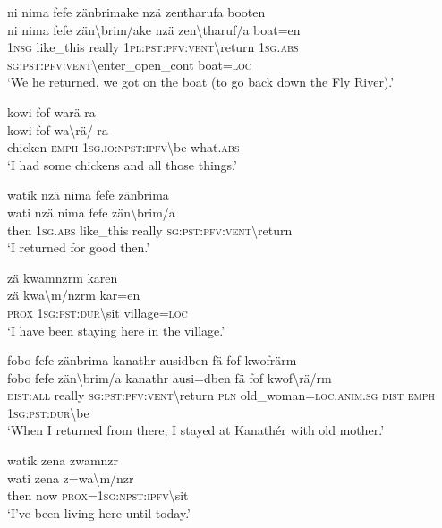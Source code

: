 \ea\label{ex:14:a3207}
ni nima fefe zänbrimake nzä zentharufa booten\\
\gll ni	nima	fefe	zän{\textbackslash}brim/ake	nzä	zen{\textbackslash}tharuf/a	boat=en\\
     1\textsc{nsg}	like\_this	really	1\textsc{pl}:\textsc{pst}:\textsc{pfv}:\textsc{vent}{\textbackslash}return	1\textsc{sg}.\textsc{abs}	\textsc{sg}:\textsc{pst}:\textsc{pfv}:\textsc{vent}{\textbackslash}enter\_open\_cont	boat=\textsc{loc}\\
\glt `We he returned, we got on the boat (to go back down the Fly River).'
\z

\ea\label{ex:14:a3208}
kowi fof warä ra\\
\gll kowi	fof	wa{\textbackslash}rä/	ra\\
     chicken	\textsc{emph}	1\textsc{sg}.\textsc{io}:\textsc{npst}:\textsc{ipfv}{\textbackslash}be	what.\textsc{abs}\\
\glt `I had some chickens and all those things.'
\z

\ea\label{ex:14:a3210}
watik nzä nima fefe zänbrima\\
\gll wati	nzä	nima	fefe	zän{\textbackslash}brim/a\\
     then	1\textsc{sg}.\textsc{abs}	like\_this	really	\textsc{sg}:\textsc{pst}:\textsc{pfv}:\textsc{vent}{\textbackslash}return\\
\glt `I returned for good then.'
\z

\ea\label{ex:14:a3211}
zä kwamnzrm karen\\
\gll zä	kwa{\textbackslash}m/nzrm	kar=en\\
     \textsc{prox}	1\textsc{sg}:\textsc{pst}:\textsc{dur}{\textbackslash}sit	village=\textsc{loc}\\
\glt `I have been staying here in the village.'
\z

\ea\label{ex:14:a3212}
fobo fefe zänbrima kanathr ausidben fä fof kwofrärm\\
\gll fobo	fefe	zän{\textbackslash}brim/a	kanathr	ausi=dben	fä	fof	kwof{\textbackslash}rä/rm\\
     \textsc{dist}:\textsc{all}	really	\textsc{sg}:\textsc{pst}:\textsc{pfv}:\textsc{vent}{\textbackslash}return	\textsc{pln}	old\_woman=\textsc{loc}.\textsc{anim}.\textsc{sg}	\textsc{dist}	\textsc{emph}	1\textsc{sg}:\textsc{pst}:\textsc{dur}{\textbackslash}be\\
\glt `When I returned from there, I stayed at Kanathér with old mother.'
\z

\ea\label{ex:14:a3213}
watik zena zwamnzr\\
\gll wati	zena	z=wa{\textbackslash}m/nzr\\
     then	now	\textsc{prox}=1\textsc{sg}:\textsc{npst}:\textsc{ipfv}{\textbackslash}sit\\
\glt `I've been living here until today.'
\z

